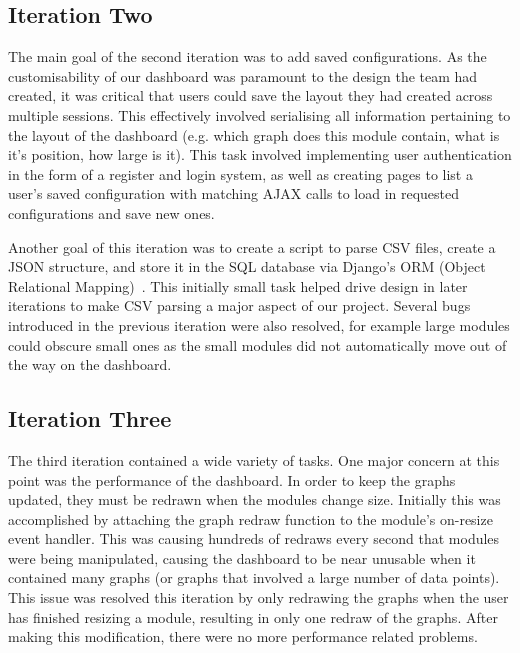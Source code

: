 \documentclass{l3proj}
\begin{document}
\subsection{Iteration Two}
\label{sec:development:iteration-Two}

The main goal of the second iteration was to add saved configurations. As the customisability of our dashboard was paramount to the design the team had created, it was critical that users could save the layout they had created across multiple sessions. This effectively involved serialising all information pertaining to the layout of the dashboard (e.g. which graph does this module contain, what is it's position, how large is it). This task involved implementing user authentication in the form of a register and login system, as well as creating pages to list a user's saved configuration with matching AJAX calls to load in requested configurations and save new ones.

Another goal of this iteration was to create a script to parse CSV files, create a JSON structure, and store it in the SQL database via Django's ORM (Object Relational Mapping)~\cite{DjangoORM}. This initially small task helped drive design in later iterations to make CSV parsing a major aspect of our project. Several bugs introduced in the previous iteration were also resolved, for example large modules could obscure small ones as the small modules did not automatically move out of the way on the dashboard.

\subsection{Iteration Three}
\label{sec:development:iteration-three}

The third iteration contained a wide variety of tasks. One major concern at this point was the performance of the dashboard. In order to keep the graphs updated, they must be redrawn when the modules change size. Initially this was accomplished by attaching the graph redraw function to the module's on-resize event handler. This was causing hundreds of redraws every second that modules were being manipulated, causing the dashboard to be near unusable when it contained many graphs (or graphs that involved a large number of data points). This issue was resolved this iteration by only redrawing the graphs when the user has finished resizing a module, resulting in only one redraw of the graphs. After making this modification, there were no more performance related problems.
\end{document}
